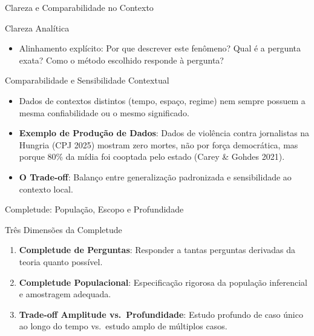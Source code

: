 \documentclass[
  ignorenonframetext,
  aspectratio=169,
  brazilian,
  t,
  10pt]{beamer}
\providecommand{\tightlist}{%
  \setlength{\itemsep}{0pt}\setlength{\parskip}{0pt}}
\begin{document}
\begin{frame}{Clareza e Comparabilidade no Contexto}
\protect{}\label{clareza-e-comparabilidade-no-contexto}
\begin{block}{Clareza Analítica}
\protect{}\label{clareza-analuxedtica}
\begin{itemize}
\tightlist
\item
  Alinhamento explícito: Por que descrever este fenômeno? Qual é a
  pergunta exata? Como o método escolhido responde à pergunta?
\end{itemize}
\end{block}

\begin{block}{Comparabilidade e Sensibilidade Contextual}
\protect{}\label{comparabilidade-e-sensibilidade-contextual}
\begin{itemize}
\tightlist
\item
  Dados de contextos distintos (tempo, espaço, regime) nem sempre
  possuem a mesma confiabilidade ou o mesmo significado.
\item
  \textbf{Exemplo de Produção de Dados}: Dados de violência contra
  jornalistas na Hungria (CPJ 2025) mostram zero mortes, não por força
  democrática, mas porque 80\% da mídia foi cooptada pelo estado (Carey
  \& Gohdes 2021).
\item
  \textbf{O Trade-off}: Balanço entre generalização padronizada e
  sensibilidade ao contexto local.
\end{itemize}
\end{block}
\end{frame}

\begin{frame}{Completude: População, Escopo e Profundidade}
\protect{}\label{completude-populauxe7uxe3o-escopo-e-profundidade}
\begin{block}{Três Dimensões da Completude}
\protect{}\label{truxeas-dimensuxf5es-da-completude}
\begin{enumerate}
\tightlist
\item
  \textbf{Completude de Perguntas}: Responder a tantas perguntas
  derivadas da teoria quanto possível.
\item
  \textbf{Completude Populacional}: Especificação rigorosa da população
  inferencial e amostragem adequada.
\item
  \textbf{Trade-off Amplitude vs.~Profundidade}: Estudo profundo de caso
  único ao longo do tempo vs.~estudo amplo de múltiplos casos.
\end{enumerate}
\end{block}
\end{frame}
\end{document}
